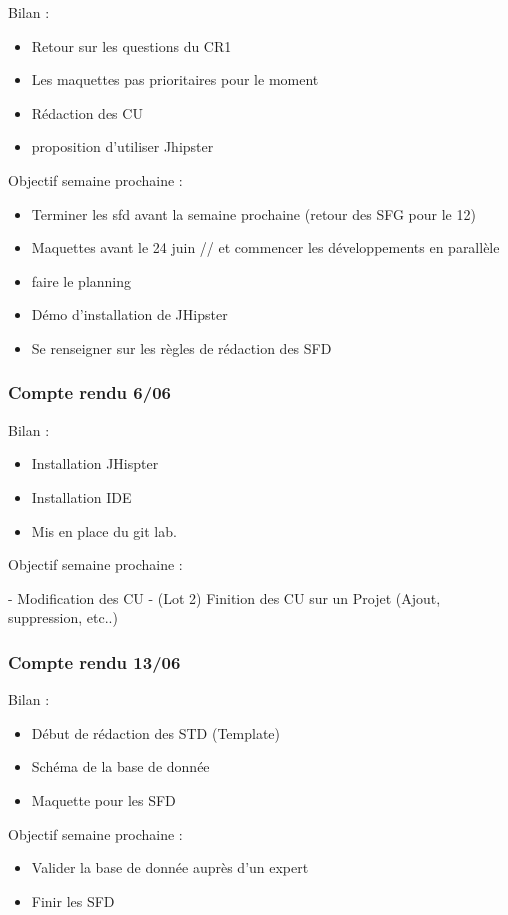 Bilan :
\begin{itemize}
\item Retour sur les questions du CR1
\item Les maquettes pas prioritaires pour le moment
\item Rédaction des CU
\item proposition d'utiliser Jhipster
\end{itemize}
Objectif semaine prochaine :
\begin{itemize}
\item Terminer les sfd avant la semaine prochaine (retour des SFG pour le 12)
\item Maquettes avant le 24 juin // et commencer les développements en parallèle 
\item faire le planning
\item Démo d’installation de JHipster
\item Se renseigner sur les règles de rédaction des SFD
\end{itemize}
\subsubsection{Compte rendu 6/06}

Bilan :
\begin{itemize}
\item Installation JHispter
\item Installation IDE
\item Mis en place du git lab. 
\end{itemize}
Objectif semaine prochaine :

- Modification des CU
- (Lot 2) Finition des CU sur un Projet (Ajout, suppression, etc..)

\subsubsection{Compte rendu 13/06 }

Bilan :
\begin{itemize}
\item Début de rédaction des STD (Template)
\item Schéma de la base de donnée
\item Maquette pour les SFD
\end{itemize}

Objectif semaine prochaine :
\begin{itemize}
\item Valider la base de donnée auprès d'un expert
\item Finir les SFD
\end{itemize}

